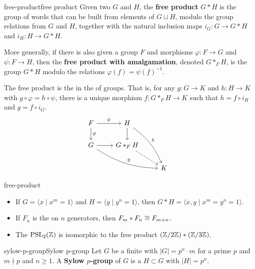 \begin{topic}{free-product}{free product}
    Given two  $G$ and $H$, the \textbf{free product} $G * H$ is the group of words that can be built from elements of $G \sqcup H$, modulo the group relations from $G$ and $H$, together with the natural inclusion maps $i_G : G \to G * H$ and $i_H : H \to G * H$.
    
    More generally, if there is also given a group $F$ and morphisms $\varphi : F \to G$ and $\psi : F \to H$, then the \textbf{free product with amalgamation}, denoted $G *_F H$, is the group $G * H$ modulo the relations $\varphi(f) = \psi(f)^{-1}$.
    
    The free product is the  in the  of groups. That is, for any $g : G \to K$ and $h : H \to K$ with $g \circ \varphi = h \circ \psi$, there is a unique morphism $f : G *_F H \to K$ such that $h = f \circ i_H$ and $g = f \circ i_G$.
    \[ \begin{tikzcd} F \arrow{r}{\psi} \arrow{d}{\varphi} & H \arrow{d} \arrow[bend left=15]{ddr}{h} & \\ G \arrow{r} \arrow[bend right=15]{drr}{g} & G *_F H \arrow[dashed]{dr} & \\ & & K \end{tikzcd} \]
\end{topic}

\begin{example}{free-product}
    \begin{itemize}
        \item If $G = \langle x \mid x^m = 1 \rangle$ and $H = \langle y \mid y^n = 1 \rangle$, then $G * H = \langle x, y \mid x^m = y^n = 1 \rangle$.
        \item If $F_n$ is the  on $n$ generators, then $F_m * F_n \cong F_{m + n}$.
        \item The  $\textup{PSL}_2(\mathbb{Z})$ is isomorphic to the free product $(\mathbb{Z}/2\mathbb{Z}) * (\mathbb{Z}/3\mathbb{Z})$.
    \end{itemize}
\end{example}

\begin{topic}{sylow-p-group}{Sylow p-group}
    Let $G$ be a finite  with $|G| = p^n \cdot m$ for a prime $p$ and $m \nmid p$ and $n \ge 1$. A \textbf{Sylow $p$-group} of $G$ is a  $H \subset G$ with $|H| = p^n$.
\end{topic}

